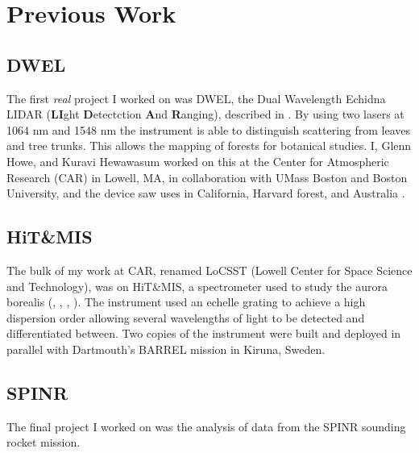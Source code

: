 \documentclass{article}
\theoremstyle{plain}
\begin{document}
    \section{Previous Work}
        \subsection{DWEL}
            The first \textit{real} project I worked on was DWEL, the
            Dual Wavelength Echidna LIDAR
            (\textbf{LI}ght \textbf{D}etectction \textbf{A}nd \textbf{R}anging),
            described in \cite{DWEL2012}.
            By using two lasers at 1064 nm and 1548 nm the instrument is able
            to distinguish scattering from leaves and tree trunks. This allows
            the mapping of forests for botanical studies. I, Glenn Howe, and
            Kuravi Hewawasum worked on this at the Center for Atmospheric
            Research (CAR) in Lowell, MA, in collaboration with UMass Boston
            and Boston University, and the device saw uses in California,
            Harvard forest, and Australia
            \cite{Li2016RadiometricCO}.
        \subsection{HiT\&MIS}
            The bulk of my work at CAR, renamed LoCSST
            (Lowell Center for Space Science and Technology), was on
            HiT\&MIS, a spectrometer used to study the aurora borealis
            (\cite{HiTandMIS2011}, \cite{2011AGUFMSA13B1890C},
            \cite{2014AGUFMSA13B4000H}, \cite{2015AGUFMSA13B2369A}). The
            instrument used an echelle grating to achieve a high dispersion
            order allowing several wavelengths of light to be detected and
            differentiated between. Two copies of the instrument were built
            and deployed in parallel with Dartmouth's BARREL mission in
            Kiruna, Sweden.
        \subsection{SPINR}
            The final project I worked on was the analysis of data from the
            SPINR sounding rocket mission.
\end{document}
